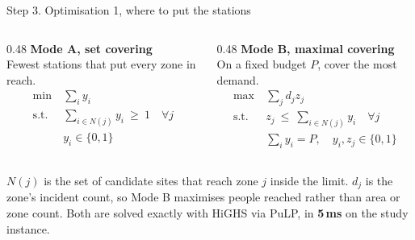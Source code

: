 \documentclass[aspectratio=169,10pt]{beamer}
\newcommand{\hairline}[1][0.6em]{%
  \par\vspace{0.3em}\noindent{\color{rule}\rule{\textwidth}{0.6pt}}\par\vspace{#1}%
}
\begin{document}
\begin{frame}{Step 3. Optimisation 1, where to put the stations}
  \vspace{0.3em}
  \begin{columns}[T,onlytextwidth]
    \begin{column}{0.48\textwidth}
      {\color{s1}\textbf{Mode A, set covering}}\\
      {\footnotesize\color{inks}Fewest stations that put every zone in reach.}\\[0.4em]
      \begin{align*}
        \min\ & \textstyle\sum_i y_i \\
        \text{s.t.}\ & \textstyle\sum_{i \in N(j)} y_i \ \geq\ 1 \quad \forall j \\
                     & y_i \in \{0,1\}
      \end{align*}
    \end{column}
    \begin{column}{0.48\textwidth}
      {\color{s2}\textbf{Mode B, maximal covering}}\\
      {\footnotesize\color{inks}On a fixed budget $P$, cover the most demand.}\\[0.4em]
      \begin{align*}
        \max\ & \textstyle\sum_j d_j z_j \\
        \text{s.t.}\ & z_j \ \leq\ \textstyle\sum_{i \in N(j)} y_i \quad \forall j \\
                     & \textstyle\sum_i y_i = P, \quad y_i, z_j \in \{0,1\}
      \end{align*}
    \end{column}
  \end{columns}
  \vspace{0.5em}
  \hairline[0.5em]
  {\footnotesize\color{inks}$N(j)$ is the set of candidate sites that reach
  zone $j$ inside the limit. $d_j$ is the zone's incident count, so Mode B
  maximises people reached rather than area or zone count. Both are solved
  exactly with HiGHS via PuLP, in \textbf{5\,ms} on the study instance.}
\end{frame}
\end{document}
